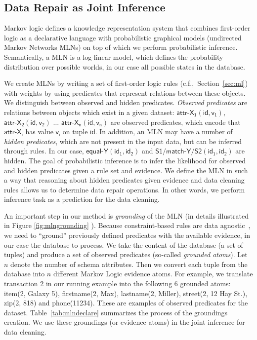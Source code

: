 \subsection{Data Repair as Joint Inference}
\label{subsec:jointinference}
Markov logic defines a knowledge representation system that combines first-order logic as a declarative language with probabilistic graphical models (undirected Markov Networks MLNs) on top of which we perform probabilistic inference. Semantically, a MLN is a log-linear model, which defines the probability distribution over possible worlds, in our case all possible states in the database.

We create MLNs by writing a set of first-order logic rules (c.f.,~Section~\ref{sec:ml}) with weights by using predicates that represent relations between these objects. We distinguish between observed and hidden predicates. \textit{Observed predicates} are relations between objects which exist in a given dataset: $\mathsf{\textsf{attr-X}_1(id,v_1)}$, $\mathsf{\textsf{attr-X}_2(id,v_2)}$ $\dots$ $\mathsf{\textsf{attr-X}_n(id,v_n)}$ are observed predicates, which encode that $\mathsf{\textsf{attr-X}_i}$ has value $\mathsf{v_i}$ on tuple $\mathsf{id}$. In addition, an MLN may have a number of \textit{hidden predicates}, which are not present in the input data, but can be inferred through rules. In our case, $\mathsf{\textsf{equal-Y}(id_1, id_2)}$ and $\mathsf{\textsf{S1/match-Y/S2}(id_1, id_2)}$ are hidden.  The goal of probabilistic inference is to infer the likelihood for observed and hidden predicates given a rule set and evidence. We define the MLN in such a way that reasoning about hidden predicates given evidence and data cleaning rules allows us to determine data repair operations. In other words, we perform inference task as a prediction for the data cleaning.

An important step in our method is \textit{grounding} of the MLN (in details illustrated in Figure \ref{fig:mlngrounding} ). Because constraint-based rules are data agnostic~\cite{fan2012foundations}, we need to ``ground'' previously defined predicates with the available evidence, in our case the database to process. We take the content of the database (a set of tuples) and produce a set of observed predicates (so-called \textit{grounded atoms}). Let $n$ denote the number of schema attributes. Then we convert each tuple from the database into $n$ different Markov Logic evidence atoms. For example, we translate transaction 2 in our running example into the following 6 grounded atoms: \textsf{item}(2, Galaxy 5), \textsf{firstname}(2, Max), \textsf{lastname}(2, Miller), \textsf{street}(2, 12 Hay St.), \textsf{zip}(2, 818) and \textsf{phone}(11234). These are examples of observed predicates for the dataset. Table~\ref{tab:mlndeclare} summarizes the process of the groundings creation. We use these groundings (or evidence atoms) in the joint inference for data cleaning. 


